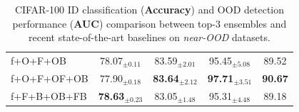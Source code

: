 \begin{table}
{\begin{tabular}{|l|c|ccc|}
f+O+F+OB    & 78.07$_{\pm 0.11}$& 83.59$_{\pm 2.01}$ & 95.45$_{\pm 5.08}$ &  \multicolumn{1}{|c|}{89.52}  \\ 
f+O+F+OF+OB & 77.90$_{\pm 0.18}$& \textbf{83.64$_{\pm 2.12}$} & \textbf{97.71$_{\pm 3.51}$} &  \multicolumn{1}{|c|}{\textbf{90.67}}  \\ 
f+F+B+OB+FB & \textbf{78.63$_{\pm 0.23}$} & 83.05$_{\pm 1.48}$ & 95.31$_{\pm 4.48}$ &  \multicolumn{1}{|c|}{89.18}  \\ \hline
\end{tabular}
}
\caption{CIFAR-100 ID classification (\textbf{Accuracy}) and OOD detection performance (\textbf{AUC}) comparison between top-3 \sysb ensembles and recent state-of-the-art baselines on \textit{near-OOD} datasets. %
}
\label{tab:propwork-meo-results-cifar100-near}
\end{table}

